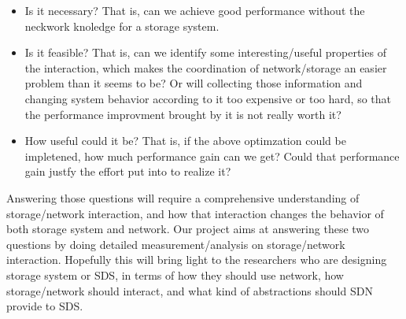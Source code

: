 \begin{itemize}
\item {}
Is it necessary? That is, can we achieve good performance without the neckwork knoledge for a storage system.

\item {}
Is it feasible? That is, can we identify some interesting/useful properties of the interaction, which makes the coordination of network/storage an easier problem than it seems to be? Or will collecting those information and changing system behavior according to it too expensive or too hard, so that the performance improvment brought by it is not really worth it?

\item{}
How useful could it be? That is, if the above optimzation could be impletened, how much performance gain can we get? Could that performance gain justfy the effort put into to realize it?

\end{itemize}

Answering those questions will require a comprehensive understanding of storage/network interaction, and how that interaction changes the behavior of both storage system and network.
Our project aims at answering these two questions by doing detailed measurement/analysis on storage/network interaction. 
Hopefully this will bring light to the researchers who are designing storage system or SDS, in terms of how they should use network, how storage/network should interact, and what kind of abstractions should SDN provide to SDS.




